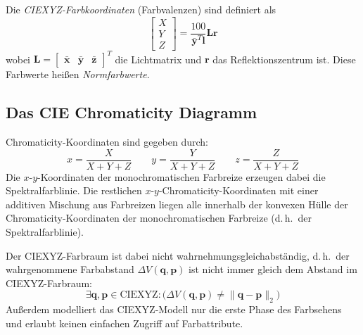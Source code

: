 \documentclass[a4paper, 11pt, accentcolor = tud3b]{tudreport}
\newcommand{\mat}[1]{\boldsymbol{#1}}
\renewcommand{\vec}[1]{\boldsymbol{\mathbf{#1}}}
\renewcommand{\dh}{d.\,h.~}
\begin{document}
			Die \emph{CIEXYZ-Farbkoordinaten} (Farbvalenzen) sind definiert als
			\begin{equation*}
				\begin{bmatrix}
					X \\
					Y \\
					Z
				\end{bmatrix}
				=
				\frac{100}{\bar{\vec{y}}^T \vec{l}} \mat{L} \vec{r}
			\end{equation*}
			wobei \( \mat{L} = \begin{bmatrix} \bar{\vec{x}} & \bar{\vec{y}} & \bar{\vec{z}} \end{bmatrix}^T \) die Lichtmatrix und \( \vec{r} \) das Reflektionszentrum ist. Diese Farbwerte heißen \emph{Normfarbwerte}.
			
			\subsection{Das CIE Chromaticity Diagramm}
				Chromaticity-Koordinaten sind gegeben durch:
				\begin{equation*}
					x = \frac{X}{X + Y + Z} \quad\quad y = \frac{Y}{X + Y + Z} \quad\quad z = \frac{Z}{X + Y + Z}
				\end{equation*}
				Die \(x\)-\(y\)-Koordinaten der monochromatischen Farbreize erzeugen dabei die Spektralfarblinie. Die restlichen \(x\)-\(y\)-Chromaticity-Koordinaten mit einer additiven Mischung aus Farbreizen liegen alle innerhalb der konvexen Hülle der Chromaticity-Koordinaten der monochromatischen Farbreize (\dh der Spektralfarblinie).
				
				Der CIEXYZ-Farbraum ist dabei nicht wahrnehmungsgleichabständig, \dh der wahrgenommene Farbabstand \( \Delta V (\vec{q}, \vec{p}) \) ist nicht immer gleich dem Abstand im CIEXYZ-Farbraum:
				\begin{equation*}
					\exists \vec{q}, \vec{p} \in \text{CIEXYZ} : \big( \Delta V(\vec{q}, \vec{p}) \neq \lVert \vec{q} - \vec{p} \rVert_2 \big)
				\end{equation*}
				Außerdem modelliert das CIEXYZ-Modell nur die erste Phase des Farbsehens und erlaubt keinen einfachen Zugriff auf Farbattribute.
\end{document}
